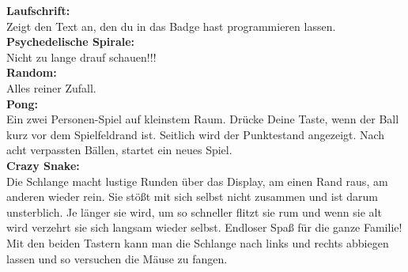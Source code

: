 \documentclass{article}
\begin{document}
\textbf{Laufschrift:}\\
Zeigt den Text an, den du in das Badge hast programmieren lassen.\\

\textbf{Psychedelische Spirale:}\\
Nicht zu lange drauf schauen!!!\\

\textbf{Random:}\\
Alles reiner Zufall.\\

\textbf{Pong:}\\
Ein zwei Personen-Spiel auf kleinstem Raum. Drücke Deine Taste, wenn der Ball kurz vor dem Spielfeldrand ist. Seitlich wird der Punktestand angezeigt. Nach acht verpassten Bällen, startet ein neues Spiel.\\

\textbf{Crazy Snake:}\\
Die Schlange macht lustige Runden über das Display, am einen Rand raus, am anderen wieder rein. Sie stößt mit sich selbst nicht zusammen und ist darum unsterblich. Je länger sie wird, um so schneller flitzt sie rum und wenn sie alt wird verzehrt sie sich langsam wieder selbst. Endloser Spaß für die ganze Familie!\\

Mit den beiden Tastern kann man die Schlange nach links und rechts abbiegen lassen und so versuchen die Mäuse zu fangen.\\



\end{document}
